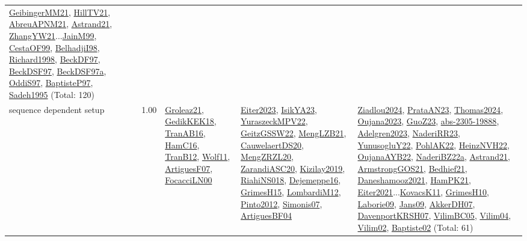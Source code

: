 {\begin{longtable}{p{3cm}r>{\raggedright\arraybackslash}p{6cm}>{\raggedright\arraybackslash}p{6cm}>{\raggedright\arraybackslash}p{8cm}}
\hyperref[detail:GeibingerMM21]{GeibingerMM21}, \hyperref[detail:HillTV21]{HillTV21}, \hyperref[detail:AbreuAPNM21]{AbreuAPNM21}, \hyperref[detail:Astrand21]{Astrand21}, \hyperref[detail:ZhangYW21]{ZhangYW21}...\hyperref[detail:JainM99]{JainM99}, \hyperref[detail:CestaOF99]{CestaOF99}, \hyperref[detail:BelhadjiI98]{BelhadjiI98}, \hyperref[detail:Richard1998]{Richard1998}, \hyperref[detail:BeckDF97]{BeckDF97}, \hyperref[detail:BeckDSF97]{BeckDSF97}, \hyperref[detail:BeckDSF97a]{BeckDSF97a}, \hyperref[detail:OddiS97]{OddiS97}, \hyperref[detail:BaptisteP97]{BaptisteP97}, \hyperref[detail:Sadeh1995]{Sadeh1995} (Total: 120)\\
\index{sequence dependent setup}\index{Concepts!sequence dependent setup}sequence dependent setup &  1.00 & \hyperref[detail:Groleaz21]{Groleaz21}, \hyperref[detail:GedikKEK18]{GedikKEK18}, \hyperref[detail:TranAB16]{TranAB16}, \hyperref[detail:HamC16]{HamC16}, \hyperref[detail:TranB12]{TranB12}, \hyperref[detail:Wolf11]{Wolf11}, \hyperref[detail:ArtiguesF07]{ArtiguesF07}, \hyperref[detail:FocacciLN00]{FocacciLN00} & \hyperref[detail:Eiter2023]{Eiter2023}, \hyperref[detail:IsikYA23]{IsikYA23}, \hyperref[detail:YuraszeckMPV22]{YuraszeckMPV22}, \hyperref[detail:GeitzGSSW22]{GeitzGSSW22}, \hyperref[detail:MengLZB21]{MengLZB21}, \hyperref[detail:CauwelaertDS20]{CauwelaertDS20}, \hyperref[detail:MengZRZL20]{MengZRZL20}, \hyperref[detail:ZarandiASC20]{ZarandiASC20}, \hyperref[detail:Kizilay2019]{Kizilay2019}, \hyperref[detail:RiahiNS018]{RiahiNS018}, \hyperref[detail:Dejemeppe16]{Dejemeppe16}, \hyperref[detail:GrimesH15]{GrimesH15}, \hyperref[detail:LombardiM12]{LombardiM12}, \hyperref[detail:Pinto2012]{Pinto2012}, \hyperref[detail:Simonis07]{Simonis07}, \hyperref[detail:ArtiguesBF04]{ArtiguesBF04} & \hyperref[detail:Ziadlou2024]{Ziadlou2024}, \hyperref[detail:PrataAN23]{PrataAN23}, \hyperref[detail:Thomas2024]{Thomas2024}, \hyperref[detail:Oujana2023]{Oujana2023}, \hyperref[detail:GuoZ23]{GuoZ23}, \hyperref[detail:abs-2305-19888]{abs-2305-19888}, \hyperref[detail:Adelgren2023]{Adelgren2023}, \hyperref[detail:NaderiRR23]{NaderiRR23}, \hyperref[detail:YunusogluY22]{YunusogluY22}, \hyperref[detail:PohlAK22]{PohlAK22}, \hyperref[detail:HeinzNVH22]{HeinzNVH22}, \hyperref[detail:OujanaAYB22]{OujanaAYB22}, \hyperref[detail:NaderiBZ22a]{NaderiBZ22a}, \hyperref[detail:Astrand21]{Astrand21}, \hyperref[detail:ArmstrongGOS21]{ArmstrongGOS21}, \hyperref[detail:Bedhief21]{Bedhief21}, \hyperref[detail:Daneshamooz2021]{Daneshamooz2021}, \hyperref[detail:HamPK21]{HamPK21}, \hyperref[detail:Eiter2021]{Eiter2021}...\hyperref[detail:KovacsK11]{KovacsK11}, \hyperref[detail:GrimesH10]{GrimesH10}, \hyperref[detail:Laborie09]{Laborie09}, \hyperref[detail:Jans09]{Jans09}, \hyperref[detail:AkkerDH07]{AkkerDH07}, \hyperref[detail:DavenportKRSH07]{DavenportKRSH07}, \hyperref[detail:VilimBC05]{VilimBC05}, \hyperref[detail:Vilim04]{Vilim04}, \hyperref[detail:Vilim02]{Vilim02}, \hyperref[detail:Baptiste02]{Baptiste02} (Total: 61)\\

\end{longtable}}
